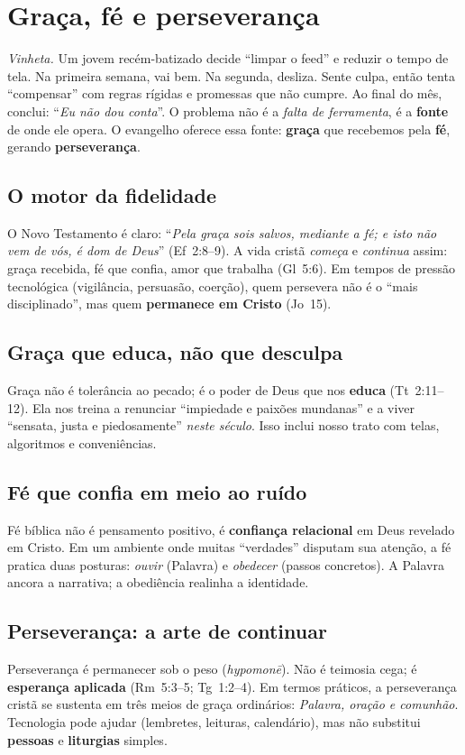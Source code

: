 \chapter{Graça, fé e perseverança}
\label{cap:graca_fe}
\noindent\textit{Vinheta.} Um jovem recém-batizado decide “limpar o feed” e reduzir o tempo de tela. Na primeira semana, vai bem. Na segunda, desliza. Sente culpa, então tenta “compensar” com regras rígidas e promessas que não cumpre. Ao final do mês, conclui: “\textit{Eu não dou conta}”. 
O problema não é a \emph{falta de ferramenta}, é a \textbf{fonte} de onde ele opera. O evangelho oferece essa fonte: \textbf{graça} que recebemos pela \textbf{fé}, gerando \textbf{perseverança}.

\section{O motor da fidelidade}
O Novo Testamento é claro: “\emph{Pela graça sois salvos, mediante a fé; e isto não vem de vós, é dom de Deus}” (Ef~2:8--9). A vida cristã \textit{começa} e \textit{continua} assim: graça recebida, fé que confia, amor que trabalha (Gl~5:6). Em tempos de pressão tecnológica (vigilância, persuasão, coerção), quem persevera não é o “mais disciplinado”, mas quem \textbf{permanece em Cristo} (Jo~15).

\section{Graça que educa, não que desculpa}
Graça não é tolerância ao pecado; é o poder de Deus que nos \textbf{educa} (Tt~2:11--12). Ela nos treina a renunciar “impiedade e paixões mundanas” e a viver “sensata, justa e piedosamente” \textit{neste século}. Isso inclui nosso trato com telas, algoritmos e conveniências.

\section{Fé que confia em meio ao ruído}
Fé bíblica não é pensamento positivo, é \textbf{confiança relacional} em Deus revelado em Cristo. Em um ambiente onde muitas “verdades” disputam sua atenção, a fé pratica duas posturas: \textit{ouvir} (Palavra) e \textit{obedecer} (passos concretos). A Palavra ancora a narrativa; a obediência realinha a identidade.

\section{Perseverança: a arte de continuar}
Perseverança é permanecer sob o peso (\emph{hypomonē}). Não é teimosia cega; é \textbf{esperança aplicada} (Rm~5:3--5; Tg~1:2--4). Em termos práticos, a perseverança cristã se sustenta em três meios de graça ordinários: \textit{Palavra, oração e comunhão}. Tecnologia pode ajudar (lembretes, leituras, calendário), mas não substitui \textbf{pessoas} e \textbf{liturgias} simples.


